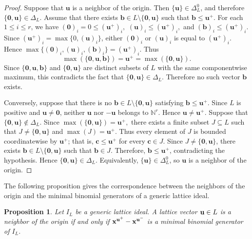 \documentclass[10pt,a4paper]{amsart}
\newtheorem{proposition}[theorem]{Proposition}
\begin{document}
\begin{proof}
Suppose that $\mathbf u$ is a neighbor of the origin. Then
$\{\mathbf u\}\in\Delta_L^0$, and therefore
$\{\mathbf0,\mathbf u\}\in\Delta_L$. Assume that there exists
$\mathbf b\in L\setminus\{\mathbf0,\mathbf u\}$
such that
$\mathbf b\le\mathbf u^+$.
For each $1 \leq i \leq r$, we have
$
(\mathbf0)_i=0\le(\mathbf u^+)_i,$ 
$(\mathbf u)_i\le(\mathbf u^+)_i,$ and
$(\mathbf b)_i\le(\mathbf u^+)_i.$
Since
$(\mathbf u^+)_i=\max\{0,(\mathbf u)_i\}$, either $(\mathbf0)_i$ or $(\mathbf u)_i$ is equal to
$(\mathbf u^+)_i$. Hence $
\max\{(\mathbf0)_i,(\mathbf u)_i,(\mathbf b)_i\}
=
(\mathbf u^+)_i.$
Thus
\[
\max(\{\mathbf0,\mathbf u,\mathbf b\})
=
\mathbf u^+
=
\max(\{\mathbf0,\mathbf u\}).
\]
Since
$\{\mathbf0,\mathbf u,\mathbf b\}$ and
$\{\mathbf0,\mathbf u\}$
are distinct subsets of $L$ with the same componentwise maximum, this
contradicts the fact that
$\{\mathbf0,\mathbf u\}\in\Delta_L$.
Therefore no such vector $\mathbf b$ exists.

Conversely, suppose that there is no
$\mathbf b\in L\setminus\{\mathbf0,\mathbf u\}$
satisfying
$\mathbf b\le\mathbf u^+$.
Since $L$ is positive and $\mathbf u\neq\mathbf0$, neither
$\mathbf u$ nor $-\mathbf u$ belongs to $\mathbb N^r$.
Hence
$\mathbf u\neq\mathbf u^+$.
Suppose that
$\{\mathbf0,\mathbf u\}\notin\Delta_L$.
Since
$
\max(\{\mathbf0,\mathbf u\})
=
\mathbf u^+,$
there exists a finite subset
$J\subseteq L$
such that
$J\neq\{\mathbf0,\mathbf u\}$
and
$\max(J)=\mathbf u^+$. Thus every element of $J$ is bounded coordinatewise by
$\mathbf u^+$; that is,
$\mathbf c\le\mathbf u^+$ for every $\mathbf c\in J$.
Since
$J\neq\{\mathbf0,\mathbf u\}$,
there exists
$\mathbf b\in L\setminus\{\mathbf0,\mathbf u\}$
such that
$\mathbf b\in J$.
Therefore,
$\mathbf b\le\mathbf u^+$,
contradicting the hypothesis.
Hence
$\{\mathbf0,\mathbf u\}\in\Delta_L$.
Equivalently,
$\{\mathbf u\}\in\Delta_L^0$,
so $\mathbf u$ is a neighbor of the origin.
\end{proof}
The following proposition gives the correspondence between the
neighbors of the origin and the minimal binomial generators of a
generic lattice ideal.

\begin{proposition} \label{cor:neighbors}
Let $I_L$ be a generic lattice ideal. A lattice vector
${\bf u}\in L$ is a neighbor of the origin if and only if
$
{\bf x}^{{\bf u}^{+}}-{\bf x}^{{\bf u}^{-}}$
is a minimal binomial generator of $I_L$.
\end{proposition}
\end{document}
